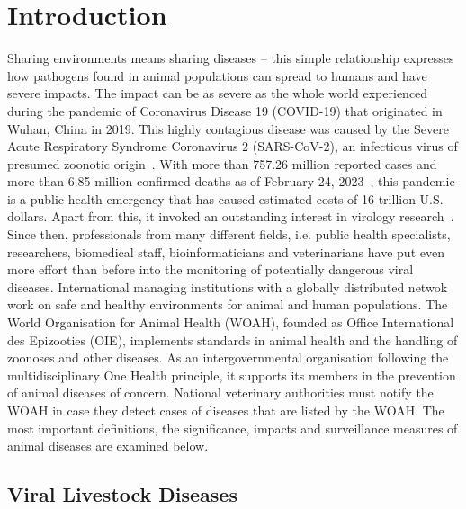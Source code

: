 \chapter{Introduction}\label{chap:introduction}

Sharing environments means sharing diseases -- this simple relationship expresses how pathogens found in animal populations can spread to humans and have severe impacts. The impact can be as severe as the whole world experienced during the pandemic of Coronavirus Disease 19 (COVID-19) that originated in Wuhan, China in 2019. This highly contagious disease was caused by the Severe Acute Respiratory Syndrome Coronavirus 2 (SARS-CoV-2), an infectious virus of presumed zoonotic origin~\cite{wu2020new}. With more than 757.26 million reported cases and more than 6.85 million confirmed deaths as of February 24, 2023~, this pandemic is a public health emergency that has caused estimated costs of 16 trillion U.S. dollars. Apart from this, it invoked an outstanding interest in virology research~\cite{covid}. \\
Since then, professionals from many different fields, i.e. public health specialists, researchers, biomedical staff, bioinformaticians and veterinarians have put even more effort than before into the monitoring of potentially dangerous viral diseases. International managing institutions with a globally distributed netwok work on safe and healthy environments for animal and human populations. The World Organisation for Animal Health (WOAH), founded as Office International des Epizooties (OIE), implements standards in animal health and the handling of zoonoses and other diseases. As an intergovernmental organisation following the multidisciplinary One Health principle, it supports its members in the prevention of animal diseases of concern. National veterinary authorities must notify the WOAH in case they detect cases of diseases that are listed by the WOAH. The most important definitions, the significance, impacts and surveillance measures of animal diseases are examined below.

\section{Viral Livestock Diseases}\label{sec:viral}

